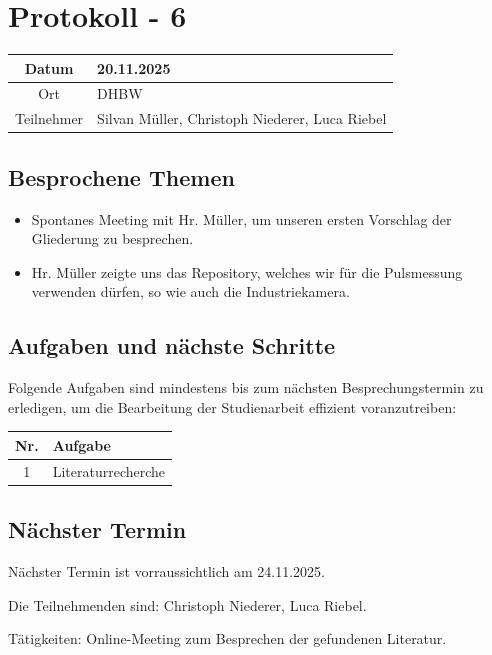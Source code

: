 \chapter{Protokoll - 6}

\begin{table}[H]
    \centering
    \begin{tabular}{|c|l|}
        \hline
        Datum& 20.11.2025 \\
        \hline
        Ort& DHBW\\
        \hline
        Teilnehmer&Silvan Müller, Christoph Niederer, Luca Riebel\\
        \hline
    \end{tabular}
\end{table}

\section{Besprochene Themen}
\begin{itemize}
    \item Spontanes Meeting mit Hr. Müller, um unseren ersten Vorschlag der Gliederung zu besprechen.
    \item Hr. Müller zeigte uns das Repository, welches wir für die Pulsmessung verwenden dürfen, so wie auch die Industriekamera.
\end{itemize}

\section{Aufgaben und nächste Schritte}
Folgende Aufgaben sind mindestens bis zum nächsten Besprechungstermin zu erledigen, um die Bearbeitung der Studienarbeit effizient voranzutreiben:

\begin{table}[H]
    \centering
    \begin{tabular}{|c|p{12cm}|}
        \hline
        \textbf{Nr.} & \textbf{Aufgabe}\\
        \hline
        1 & Literaturrecherche\\
        \hline
    \end{tabular}
\end{table}

\section{Nächster Termin}
Nächster Termin ist vorraussichtlich am 24.11.2025.

Die Teilnehmenden sind: Christoph Niederer, Luca Riebel. 

Tätigkeiten: Online-Meeting zum Besprechen der gefundenen Literatur.